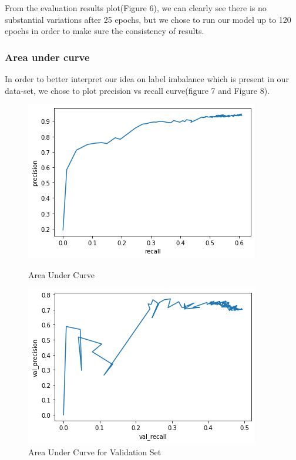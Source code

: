 \documentclass[a4paper,19pt]{article}
\begin{document}
From the evaluation results plot(Figure 6), we can clearly see there is no substantial variations after 25 epochs, but we chose to run our model up to 120 epochs in order to make sure the consistency of results. 


\subsubsection{Area under curve}

In order to better interpret our idea on label imbalance which is present in our data-set, we chose to plot precision vs recall curve(figure 7 and Figure 8).


\begin{figure}[h!]
  \centering
  \begin{minipage}[b]{0.4\textwidth}
    \includegraphics[scale=0.6]{images/aoct.png}
    \caption{Area Under Curve}
    \label{fig:Area Under Curve}
  \end{minipage}
  \hfill
  \begin{minipage}[b]{0.4\textwidth}
    \includegraphics[scale=0.6]{images/aocv.png}
    \caption{Area Under Curve for Validation Set}
    \label{fig:Area Under Curve for Validation Set}
  \end{minipage}
\end{figure}
\end{document}
